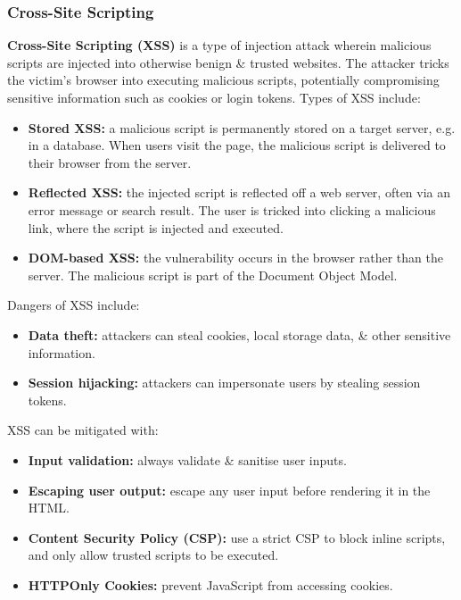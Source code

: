 \documentclass[a4paper,11pt]{article}
\begin{document}
\subsubsection{Cross-Site Scripting}
\textbf{Cross-Site Scripting (XSS)} is a type of injection attack wherein malicious scripts are injected into otherwise benign \& trusted websites.
The attacker tricks the victim's browser into executing malicious scripts, potentially compromising sensitive information such as cookies or login tokens.
Types of XSS include:
\begin{itemize}
    \item   \textbf{Stored XSS:} a malicious script is permanently stored on a target server, e.g. in a database.
            When users visit the page, the malicious script is delivered to their browser from the server.
    \item   \textbf{Reflected XSS:} the injected script is reflected off a web server, often via an error message or search result.
        The user is tricked into clicking a malicious link, where the script is injected and executed.
    \item   \textbf{DOM-based XSS:} the vulnerability occurs in the browser rather than the server.
            The malicious script is part of the Document Object Model.
\end{itemize}

Dangers of XSS include:
\begin{itemize}
    \item   \textbf{Data theft:} attackers can steal cookies, local storage data, \& other sensitive information.
    \item   \textbf{Session hijacking:} attackers can impersonate users by stealing session tokens.
\end{itemize}

XSS can be mitigated with:
\begin{itemize}
    \item   \textbf{Input validation:} always validate \& sanitise user inputs.
    \item   \textbf{Escaping user output:} escape any user input before rendering it in the HTML.
    \item   \textbf{Content Security Policy (CSP):} use a strict CSP to block inline scripts, and only allow trusted scripts to be executed.
    \item   \textbf{HTTPOnly Cookies:} prevent JavaScript from accessing cookies.
\end{itemize}
\end{document}

